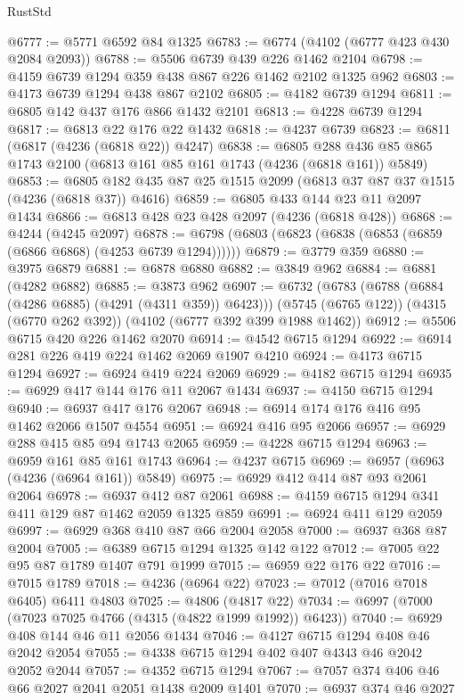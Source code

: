 \begin{lexlean}{RustStd}
\begin{coremodule}
@6777 := @5771 @6592 @84 @1325
@6783 := @6774 (@4102 (@6777 @423 @430 @2084 @2093))
@6788 := @5506 @6739 @439 @226 @1462 @2104
@6798 := @4159 @6739 @1294 @359 @438 @867 @226 @1462 @2102 @1325 @962
@6803 := @4173 @6739 @1294 @438 @867 @2102
@6805 := @4182 @6739 @1294
@6811 := @6805 @142 @437 @176 @866 @1432 @2101
@6813 := @4228 @6739 @1294
@6817 := @6813 @22 @176 @22 @1432
@6818 := @4237 @6739
@6823 := @6811 (@6817 (@4236 (@6818 @22)) @4247)
@6838 := @6805 @288 @436 @85 @865 @1743 @2100 (@6813 @161 @85 @161 @1743 (@4236 (@6818 @161)) @5849)
@6853 := @6805 @182 @435 @87 @25 @1515 @2099 (@6813 @37 @87 @37 @1515 (@4236 (@6818 @37)) @4616)
@6859 := @6805 @433 @144 @23 @11 @2097 @1434
@6866 := @6813 @428 @23 @428 @2097 (@4236 (@6818 @428))
@6868 := @4244 (@4245 @2097)
@6878 := @6798 (@6803 (@6823 (@6838 (@6853 (@6859 (@6866 @6868) (@4253 @6739 @1294))))))
@6879 := @3779 @359
@6880 := @3975 @6879
@6881 := @6878 @6880
@6882 := @3849 @962
@6884 := @6881 (@4282 @6882)
@6885 := @3873 @962
@6907 := @6732
    (@6783 (@6788 (@6884 (@4286 @6885) (@4291 (@4311 @359)) @6423)))
    (@5745 (@6765 @122))
    (@4315 (@6770 @262 @392))
    (@4102 (@6777 @392 @399 @1988 @1462))
@6912 := @5506 @6715 @420 @226 @1462 @2070
@6914 := @4542 @6715 @1294
@6922 := @6914 @281 @226 @419 @224 @1462 @2069 @1907 @4210
@6924 := @4173 @6715 @1294
@6927 := @6924 @419 @224 @2069
@6929 := @4182 @6715 @1294
@6935 := @6929 @417 @144 @176 @11 @2067 @1434
@6937 := @4150 @6715 @1294
@6940 := @6937 @417 @176 @2067
@6948 := @6914 @174 @176 @416 @95 @1462 @2066 @1507 @4554
@6951 := @6924 @416 @95 @2066
@6957 := @6929 @288 @415 @85 @94 @1743 @2065
@6959 := @4228 @6715 @1294
@6963 := @6959 @161 @85 @161 @1743
@6964 := @4237 @6715
@6969 := @6957 (@6963 (@4236 (@6964 @161)) @5849)
@6975 := @6929 @412 @414 @87 @93 @2061 @2064
@6978 := @6937 @412 @87 @2061
@6988 := @4159 @6715 @1294 @341 @411 @129 @87 @1462 @2059 @1325 @859
@6991 := @6924 @411 @129 @2059
@6997 := @6929 @368 @410 @87 @66 @2004 @2058
@7000 := @6937 @368 @87 @2004
@7005 := @6389 @6715 @1294 @1325 @142 @122
@7012 := @7005 @22 @95 @87 @1789 @1407 @791 @1999
@7015 := @6959 @22 @176 @22
@7016 := @7015 @1789
@7018 := @4236 (@6964 @22)
@7023 := @7012 (@7016 @7018 @6405) @6411 @4803
@7025 := @4806 (@4817 @22)
@7034 := @6997 (@7000 (@7023 @7025 @4766 (@4315 (@4822 @1999 @1992)) @6423))
@7040 := @6929 @408 @144 @46 @11 @2056 @1434
@7046 := @4127 @6715 @1294 @408 @46 @2042 @2054
@7055 := @4338 @6715 @1294 @402 @407 @4343 @46 @2042 @2052 @2044
@7057 := @4352 @6715 @1294
@7067 := @7057 @374 @406 @46 @66 @2027 @2041 @2051 @1438 @2009 @1401
@7070 := @6937 @374 @46 @2027

\end{coremodule}
\end{lexlean}
